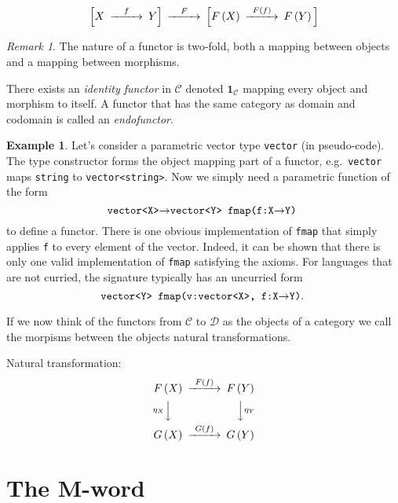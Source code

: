 \documentclass[11pt,a4paper]{scrartcl}
\newcommand{\of}[1]{\left(#1\right)}
\newcommand{\idm}[1]{\mathbf{1}_{#1}}
\newcommand{\cdef}[1]{\emph{#1}}
\newcommand{\code}[1]{\texttt{#1}}
\theoremstyle{plain}
\theoremstyle{definition}
\newtheorem{exmp}{Example}
\theoremstyle{remark}
\newtheorem*{remark}{Remark}
\begin{document}
\begin{displaymath}
\begin{CD}
	\Big[ X @>{f}>> Y \Big] @>{F}>> \Big[ F\of X @>{F\of f}>> F\of Y \Big]
\end{CD}
\end{displaymath}

\begin{remark}
The nature of a functor is two-fold, both a mapping between objects and a mapping between morphisms.
\end{remark}

There exists an \cdef{identity functor} in $\mathcal{C}$ denoted $\idm{\mathcal{C}}$ mapping every object and morphism to itself. A functor that has the same category as domain and codomain is called an \cdef{endofunctor}.

\begin{exmp}
	Let's consider a parametric vector type \code{vector} (in pseudo-code). The type constructor forms the object mapping part of a functor, e.g.\ \code{vector} maps \code{string} to \code{vector<string>}. Now we simply need a parametric function of the form 
	\[\text{\code{vector<X>$\to$vector<Y> fmap(f:X$\to$Y)} }\]
	to define a functor. There is one obvious implementation of \code{fmap} that simply applies \code{f} to every element of the vector. Indeed, it can be shown that there is only one valid implementation of \code{fmap} satisfying the axioms. For languages that are not curried, the signature typically has an uncurried form 
	\[\text{\code{vector<Y> fmap(v:vector<X>, f:X$\to$Y)}. }\]
\end{exmp}

If we now think of the functors from $\mathcal{C}$ to $\mathcal{D}$ as the objects of a category we call the morpisms between the objects natural transformations.

Natural transformation:
\begin{displaymath}
\begin{CD}
	F\of X @>{F\of f}>> F\of Y \\
	@V{\eta_X}VV @VV{\eta_Y}V \\
	G\of X @>{G\of f}>> G\of Y
\end{CD}
\end{displaymath}

\section{The M-word}
\end{document}
